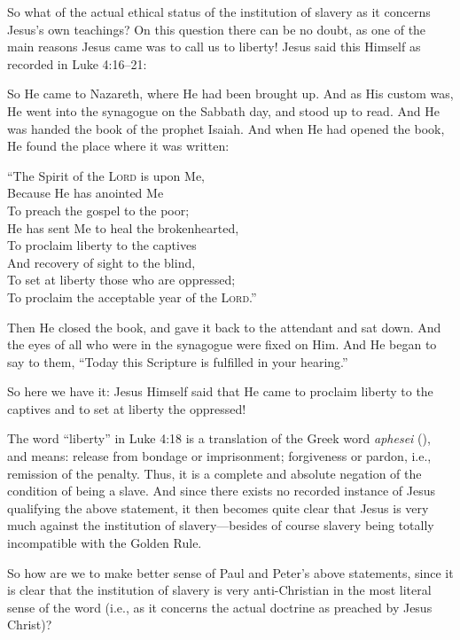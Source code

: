 \documentclass[letterpaper,12pt]{article}
\newenvironment{squotation}
  {\small\quotation}
  {\endquotation\normalsize}
\newenvironment{sverse}
  {\small\verse}
  {\endverse\normalsize}
\begin{document}
So what of the actual ethical status of the institution of slavery as it concerns Jesus's own teachings? On this question there can be no doubt, as one of the main reasons Jesus came was to call us to liberty! Jesus said this Himself as recorded in Luke 4:16--21:

\begin{squotation}
So He came to Nazareth, where He had been brought up. And as His custom was, He went into the synagogue on the Sabbath day, and stood up to read. And He was handed the book of the prophet Isaiah. And when He had opened the book, He found the place where it was written:

\begin{sverse}
``The Spirit of the \textsc{Lord} is upon Me,\\
Because He has anointed Me\\
To preach the gospel to the poor;\\
He has sent Me to heal the brokenhearted,\\
To proclaim liberty to the captives\\
And recovery of sight to the blind,\\
To set at liberty those who are oppressed;\\
To proclaim the acceptable year of the \textsc{Lord}.''
\end{sverse}

Then He closed the book, and gave it back to the attendant and sat down. And the eyes of all who were in the synagogue were fixed on Him. And He began to say to them, ``Today this Scripture is fulfilled in your hearing.''
\end{squotation}

So here we have it: Jesus Himself said that He came to proclaim liberty to the captives and to set at liberty the oppressed!

The word ``liberty'' in Luke 4:18 is a translation of the Greek word \emph{aphesei} (), and means: release from bondage or imprisonment; forgiveness or pardon, i.e., remission of the penalty. Thus, it is a complete and absolute negation of the condition of being a slave. And since there exists no recorded instance of Jesus qualifying the above statement, it then becomes quite clear that Jesus is very much against the institution of slavery---besides of course slavery being totally incompatible with the Golden Rule.

So how are we to make better sense of Paul and Peter's above statements, since it is clear that the institution of slavery is very anti-Christian in the most literal sense of the word (i.e., as it concerns the actual doctrine as preached by Jesus Christ)?
\end{document}
